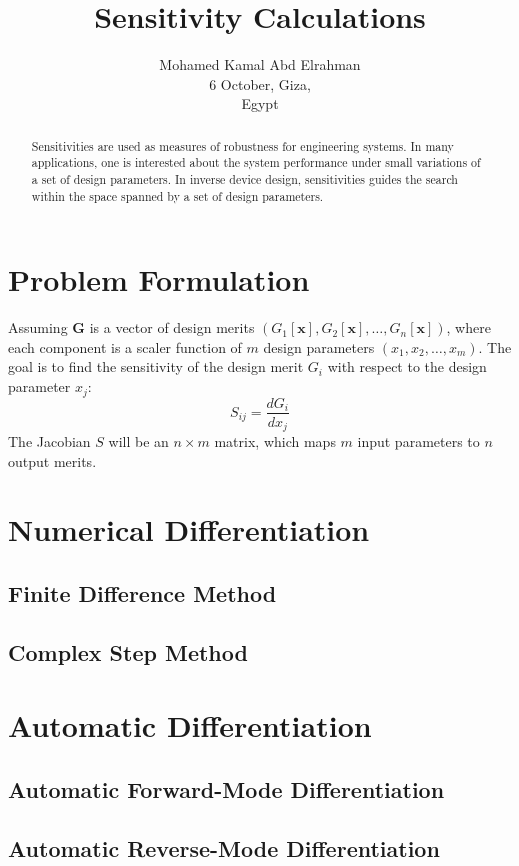 \documentclass{tufte-handout}
\title{Sensitivity Calculations}
\author[mohamedkamal]{Mohamed Kamal Abd Elrahman \\
6 October, Giza,\\ Egypt}
\begin{document}
	\maketitle
	\begin{abstract}
		\noindent 
	Sensitivities are used as measures of robustness for engineering systems. In many applications, one is interested about the system performance under small variations of a set of design parameters. In inverse device design, sensitivities guides the search within the space spanned by a set of design parameters.  
	\end{abstract}
\section{Problem Formulation}	
 Assuming $\mathbf{G}$	is a vector of design merits $ (G_1[\mathbf{x}], G_2[\mathbf{x}], \dots,G_n[\mathbf{x}]) $, where each component is a scaler function of $m$ design parameters	$ (x_1,x_2,\dots, x_m)$. The goal is to find the sensitivity of the design merit $G_i$  with respect to the design parameter $x_j$:
	 \begin{equation}
	 S_{ij} = \frac{d G_i}{dx_j}
	 \end{equation}
The Jacobian $S$ will be an $n \times m$ matrix, which maps $m$ input parameters to $n$ output merits.   
\section{Numerical Differentiation}

\subsection{Finite Difference Method}
\subsection{Complex Step Method}
\section{Automatic Differentiation}

\subsection{Automatic Forward-Mode Differentiation}
\subsection{Automatic Reverse-Mode Differentiation}
\end{document}
